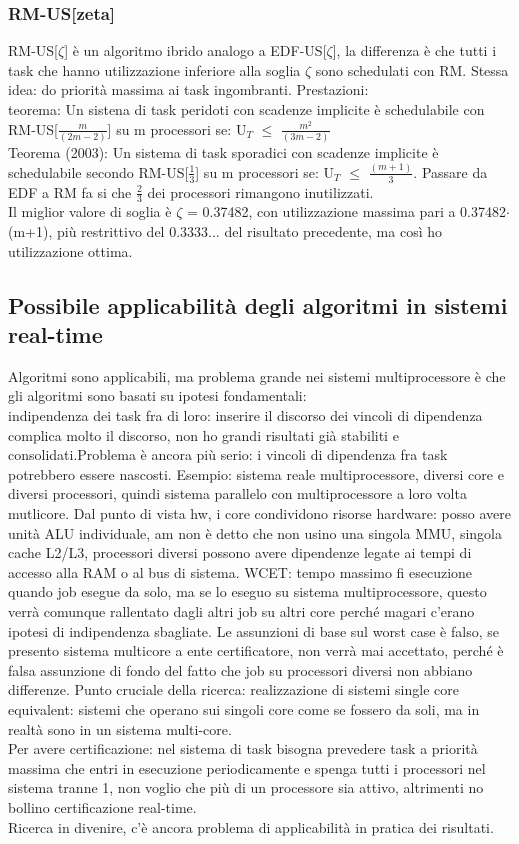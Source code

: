 \documentclass[12pt, oneside]{extbook}
\begin{document}
\subsubsection{RM-US[zeta]}
RM-US[$\zeta$] è un algoritmo ibrido analogo a EDF-US[$\zeta$], la differenza è che tutti i task che hanno utilizzazione inferiore alla soglia $\zeta$ sono schedulati con RM. Stessa idea: do priorità massima ai task ingombranti. Prestazioni:\\
teorema: Un sistena di task peridoti con scadenze implicite è schedulabile con RM-US[$\frac{m}{(2m - 2)}$] su m processori se: U$_T$ $\leq$ $\frac{m^2}{(3m - 2)}$\\ Teorema (2003): Un sistema di task sporadici con scadenze implicite è schedulabile secondo RM-US[$\frac{1}{3}$] su m processori se: U$_T$ $\leq$ $\frac{(m+1)}{3}$. Passare da EDF a RM fa si che $\frac{2}{3}$ dei processori rimangono inutilizzati.\\Il miglior valore di soglia è $\zeta$ = 0.37482, con utilizzazione massima pari a 0.37482$\cdot$(m+1), più restrittivo del 0.3333... del risultato precedente, ma così ho utilizzazione ottima.
\subsection{Possibile applicabilità degli algoritmi in sistemi real-time}
Algoritmi sono applicabili, ma problema grande nei sistemi multiprocessore è che gli algoritmi sono basati su ipotesi fondamentali:\\
indipendenza dei task fra di loro: inserire il discorso dei vincoli di dipendenza complica molto il discorso, non ho grandi risultati già stabiliti e consolidati.Problema è ancora più serio: i vincoli di dipendenza fra task potrebbero essere nascosti. Esempio: sistema reale multiprocessore, diversi core e diversi processori, quindi sistema parallelo con multiprocessore a loro volta mutlicore. Dal punto di vista hw, i core condividono risorse hardware: posso avere unità ALU individuale, am non è detto che non usino una singola MMU, singola cache L2/L3, processori diversi possono avere dipendenze legate ai tempi di accesso alla RAM o al bus di sistema. WCET: tempo massimo fi esecuzione quando job esegue da solo, ma se lo eseguo su sistema multiprocessore, questo verrà comunque rallentato dagli altri job su altri core perché magari c'erano ipotesi di indipendenza sbagliate. Le assunzioni di base sul worst case è falso, se presento sistema multicore a ente certificatore, non verrà mai accettato, perché è falsa assunzione di fondo del fatto che job su processori diversi non abbiano differenze. Punto cruciale della ricerca: realizzazione di sistemi single core equivalent: sistemi che operano sui singoli core come se fossero da soli, ma in realtà sono in un sistema multi-core.\\ Per avere certificazione: nel sistema di task bisogna prevedere task a priorità massima che entri in esecuzione periodicamente e spenga tutti i processori nel sistema tranne 1, non voglio che più di un processore sia attivo, altrimenti no bollino certificazione real-time.\\ Ricerca in divenire, c'è ancora problema di applicabilità in pratica dei risultati.
\end{document}
